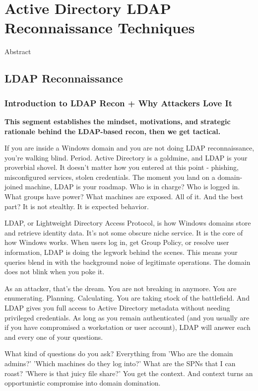 \chapter{Active Directory LDAP Reconnaissance Techniques}

Abstract

\section{LDAP Reconnaissance}

\subsection{Introduction to LDAP Recon + Why Attackers Love It}

\textbf{This segment establishes the mindset, motivations, and strategic rationale behind the LDAP-based recon, then we get tactical.}

If you are inside a Windows domain and you are not doing LDAP reconnaissance, you’re walking blind. Period. Active Directory is a goldmine, and LDAP is your proverbial shovel. It doesn’t matter how you entered at this point - phishing, misconfigured services, stolen credentials. The moment you land on a domain-joined machine, LDAP is your roadmap. Who is in charge? Who is logged in. What groups have power? What machines are exposed. All of it. And the best part? It is not stealthy. It is expected behavior.

LDAP, or Lightweight Directory Access Protocol, is how Windows domains store and retrieve identity data. It's not some obscure niche service. It is the core of how Windows works. When users log in, get Group Policy, or resolve user information, LDAP is doing the legwork behind the scenes. This means your queries blend in with the background noise of legitimate operations. The domain does not blink when you poke it.

As an attacker, that’s the dream. You are not breaking in anymore. You are enumerating. Planning. Calculating. You are taking stock of the battlefield. And LDAP gives you full access to Active Directory metadata without needing privileged credentials. As long as you remain authenticated (and you usually are if you have compromised a workstation or user account), LDAP will answer each and every one of your questions.

What kind of questions do you ask? Everything from 'Who are the domain admins?' 'Which machines do they log into?' What are the SPNs that I can roast? 'Where is that juicy file share?' You get the context. And context turns an opportunistic compromise into domain domination.

